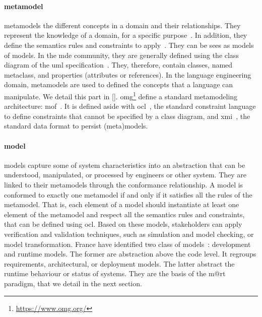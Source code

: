 \paragraph{\Gls{metamodel}}
\Glspl{metamodel} the different concepts in a domain and their relationships.
They represent the knowledge of a domain, for a specific purpose~\cite{DBLP:conf/iceccs/BezivinJT05}.
In addition, they define the semantics rules and constraints to apply~\cite{DBLP:journals/computer/Schmidt06}.
They can be sees as \glspl{model} of \glspl{model}.
In the \gls{mde} community, they are generally defined using the class diagram of the \gls{uml} specification~\cite{omg2017umlspec}.
They, therefore, contain classes, named metaclass, and properties (attributes or references).
In the language engineering domain, \glspl{metamodel} are used to defined the concepts that a language can manipulate.
We detail this part in \autoref{}. 
\gls{omg}\footnote{\url{https://www.omg.org/}} define a standard metamodeling architecture: \gls{mof}~\cite{MOF:Spec}.
It is defined aside with \gls{ocl}~\cite{OCL:Spec}, the standard constraint language to define constraints that cannot be specified by a class diagram, and \gls{xmi}~\cite{XMI:Spec}, the standard data format to persist (meta)\glspl{model}. 

\paragraph{\Gls{model}}
\Glspl{model} capture some of system characteristics into an abstraction that can be understood, manipulated, or processed by engineers or other system.
They are linked to their \glspl{metamodel} through the conformance relationship.
A \gls{model} is conformed to exactly one \gls{metamodel} if and only if it satisfies all the rules of the \gls{metamodel}.
That is, each element of a \gls{model} should instantiate at least one element of the \gls{metamodel} and respect all the semantics rules and constraints, that can be defined using \gls{ocl}.
Based on these models, stakeholders can apply verification and validation techniques, such as simulation and model checking, or model transformation.
France \etal have identified two class of models~\cite{DBLP:conf/icse/FranceR07}: development and runtime models.
The former are abstraction above the code level.
It regroups requirements, architectural, or deployment models.
The latter abstract the runtime behaviour or status of systems. 
They are the basis of the \gls{m@rt} paradigm, that we detail in the next section.

